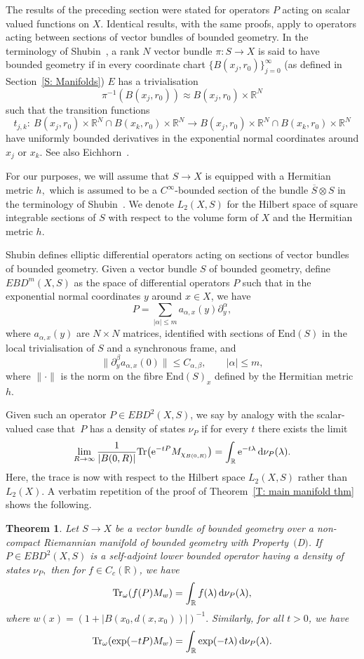 \documentclass[pdftex]{sigma}
\numberwithin{equation}{section}
\newtheorem{Theorem}{Theorem}[section]
\begin{document}
The results of the preceding section were stated for operators $P$ acting on scalar valued functions on $X.$ Identical results, with the same proofs, apply to operators acting between sections of vector bundles of bounded geometry. In the terminology of Shubin~\cite{Shubin1992}, a rank $N$ vector bundle $\pi\colon S\to X$ is said to have bounded geometry if in every coordinate chart $\{B(x_j,r_0)\}_{j=0}^\infty$ (as defined in Section~\ref{S: Manifolds}) $E$ has a trivialisation \[
 \pi^{-1}(B(x_j,r_0)) \approx B(x_j,r_0)\times \mathbb{R}^N
\]
such that the transition functions
\[
 t_{j,k}\colon \ B(x_j,r_0)\times \mathbb{R}^N\cap B(x_k,r_0)\times \mathbb{R}^N \to B(x_j,r_0)\times \mathbb{R}^N\cap B(x_k,r_0)\times \mathbb{R}^N
\]
have uniformly bounded derivatives in the exponential normal coordinates around $x_j$ or $x_k.$ See also Eichhorn~\cite[p.~65]{Eichhorn2008}.

For our purposes, we will assume that $S\to X$ is equipped with a Hermitian metric $h,$ which is assumed to be a $C^\infty$-bounded section of the bundle $\overline{S}\otimes S$ in the terminology of Shubin~\mbox{\cite[Appendix 1]{Shubin1992}}. We denote $L_2(X,S)$ for the Hilbert space of square integrable sections of $S$ with respect to the volume form of $X$ and the Hermitian metric $h.$

Shubin defines elliptic differential operators
acting on sections of vector bundles of bounded geometry.
Given a vector bundle $S$ of bounded geometry, define $EBD^m(X,S)$ as the space of differential operators $P$ such that in the exponential normal coordinates $y$ around $x\in X$, we have
\[
 P = \sum_{|\alpha|\leq m} a_{\alpha,x}(y)\partial_y^{\alpha},
\]
where $a_{\alpha,x}(y)$ are $N\times N$ matrices, identified with sections of $\mathrm{End}(S)$ in the local trivialisation of $S$ and a synchronous frame, and
\[
 \big\|\partial_y^{\beta} a_{\alpha,x}(0)\big\| \leq C_{\alpha,\beta},\qquad |\alpha|\leq m,
\]
where $\|\cdot\|$ is the norm on the fibre $\mathrm{End}(S)_x$ defined by the Hermitian metric $h.$

Given such an operator $P \in EBD^2(X,S)$, we say by analogy with the scalar-valued case that~$P$ has a density of states $\nu_P$ if for every $t$ there exists the limit
\[
 \lim_{R\to\infty} \frac{1}{|B(0,R)|}\mathrm{Tr}\big({\rm e}^{-tP}M_{\chi_{B(0,R)}}\big) = \int_{\mathbb{R}} {\rm e}^{-t\lambda}\,{\rm d}\nu_P(\lambda).
\]
Here, the trace is now with respect to the Hilbert space $L_2(X,S)$ rather than $L_2(X).$ A verbatim repetition of the proof of Theorem~\ref{T: main manifold thm} shows the following.
\begin{Theorem}\label{T: vector bundle dos thm}
 Let $S\to X$ be a vector bundle of bounded geometry over a non-compact Riemannian manifold of bounded geometry with Property~$($D$)$. If $P \in EBD^2(X,S)$ is a self-adjoint lower bounded operator having a density of states $\nu_P,$ then for $f\in C_c(\mathbb{R})$, we have
 \[
 \mathrm{Tr}_{\omega}(f(P)M_w) = \int_\mathbb{R} f(\lambda)\,{\rm d}\nu_P(\lambda),
 \]
 where $w(x) = (1+|B(x_0,d(x,x_0))|)^{-1}.$
 Similarly, for all $t>0$, we have
 \[
 \mathrm{Tr}_{\omega}(\exp(-tP)M_w) = \int_\mathbb{R} \exp(-t\lambda)\,{\rm d}\nu_P(\lambda).
 \]
\end{Theorem}
\end{document}
